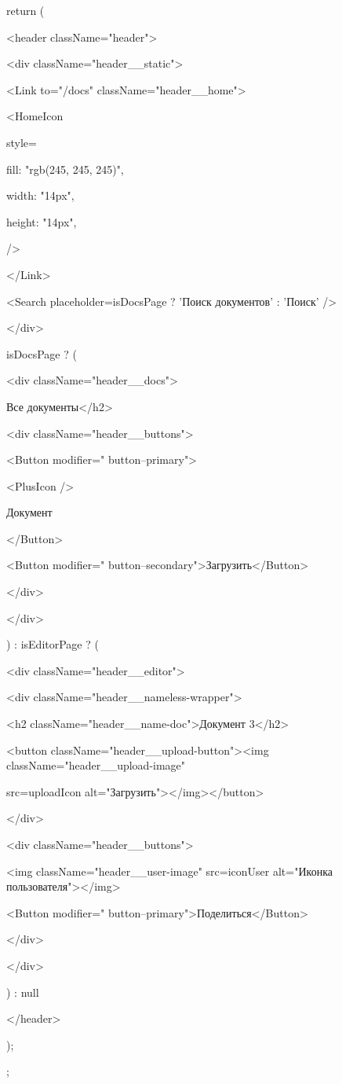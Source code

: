 \documentclass[a4paper,12pt]{article}
\begin{document}
\begin{description}
{  \item return (
    \item <header className="header">
      \item <div className="header\_\_static">
        \item <Link to="/docs" className="header\_\_home">
          \item <HomeIcon
            \item style={{
              \item fill: "rgb(245, 245, 245)",
              \item width: "14px",
              \item height: "14px",
            \item }}
          \item />
        \item </Link>
        \item <Search placeholder={isDocsPage ? 'Поиск документов' : 'Поиск'} />
      \item </div>
      \item {isDocsPage ? (
        \item <div className="header\_\_docs">
          \item <h2>Все документы</h2>
          \item <div className="header\_\_buttons">
            \item <Button modifier=" button--primary">
              \item <PlusIcon />
              \item Документ
            \item </Button>
            \item <Button modifier=" button--secondary">Загрузить</Button>
          \item </div>
        \item </div>
      \item ) : isEditorPage ? (
        \item <div className="header\_\_editor">
          \item <div className="header\_\_nameless-wrapper">
            \item <h2 className="header\_\_name-doc">Документ 3</h2>
            \item <button className="header\_\_upload-button"><img className="header\_\_upload-image" 
            \item src={uploadIcon} alt="Загрузить"></img></button>
          \item </div>
          \item <div className="header\_\_buttons">
            \item <img className="header\_\_user-image" src={iconUser} alt="Иконка пользователя"></img>
            \item <Button modifier=" button--primary">Поделиться</Button>
          \item </div>
        \item </div>
      \item ) : null}
    \item </header>
  \item );
\item };


\end{description}
\end{document}
